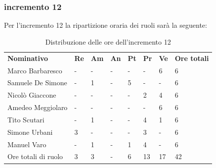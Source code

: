 \subsubsection{incremento 12}
Per l'incremento 12 la ripartizione oraria dei ruoli sarà la seguente:
\begin{center}
    \begin{table}[ht!]
        \centering
        \caption{Distribuzione delle ore dell'incremento 12}
        \vspace{5px}
        \renewcommand{\arraystretch}{1.8}
        \begin{tabular}{p{100px} p{20px} p{20px} p{20px} p{20px} p{20px} p{20px} p{50px} }
            \rowcolor{logo!70} \textbf{Nominativo} & \textbf{Re} & \textbf{Am} & \textbf{An} & \textbf{Pt} & \textbf{Pr} & \textbf{Ve} & \textbf{Ore totali} \\
            Marco Barbaresco                       & -           & -           & -           & -           & -           & 6           & 6                   \\
            Samuele De Simone                      & -           & 1           & -           & 5           & -           & -           & 6                   \\
            Nicolò Giaccone                        & -           & -           & -           & -           & 2           & 4           & 6                   \\
            Amedeo Meggiolaro                      & -           & -           & -           & -           & -           & 6           & 6                   \\
            Tito Scutari                           & -           & 1           & -           & -           & 4           & 1           & 6                   \\
            Simone Urbani                          & 3           & -           & -           & -           & 3           & -           & 6                   \\
            Manuel Varo                            & -           & 1           & -           & 1           & 4           & -           & 6                   \\
            Ore totali di ruolo                    & 3           & 3           & -           & 6           & 13          & 17          & 42                  \\
        \end{tabular}
    \end{table}
\end{center}
